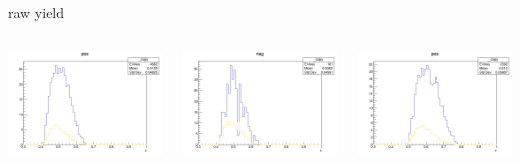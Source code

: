 \begin{frame}{raw yield}
\begin{columns}
\begin{column}[T]{0.25\textwidth}
\includegraphics[width = \textwidth]{results/yield/statistics/yield_x_Q2_z_0.40_4.000_0.50_pos.png}
\end{column}
\begin{column}[T]{0.25\textwidth}
\includegraphics[width = \textwidth]{results/yield/statistics/yield_x_Q2_z_0.40_4.000_0.50_neg.png}
\end{column}
\begin{column}[T]{0.25\textwidth}
\includegraphics[width = \textwidth]{results/yield/statistics/yield_x_Q2_z_0.40_4.000_0.60_pos.png}

\end{column}
\end{columns}
\end{frame}
